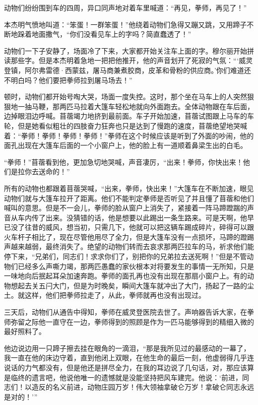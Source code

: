 动物们纷纷围到车的四周，异口同声地对着车里喊道：“再见，拳师，再见了！”

本杰明气愤地叫道：“笨蛋！一群笨蛋！”他绕着动物们急得又蹦又跳，又用蹄子不断地跺着地面撒气，“你们没看见车上的字吗？简直蠢透了！”

动物们一下子安静了，场面冷了下来，大家都开始关注车上面的字。穆尔丽开始拼读那些字。但是本杰明着急地一把把他推开，他的声音划开了死寂的气氛：“‘威灵登镇，阿尔弗雷德·西蒙兹，屠马商兼煮胶商，皮革和骨粉的供应商。’你们难道还不明白吗？他们要把拳师拉到屠马场去！”

顿时，动物们都开始号啕大哭，场面一度失控。这时，那个坐在马车上的人突然狠狠地一抽马鞭，那两匹马拉着大篷车轻松地就向外面跑去。全体动物跟在车后面，边掉眼泪边呼喊。苜蓿竭力地挤到最前面。车子开始加速，苜蓿试图跟上马车的车轮，但是她看似粗壮的四肢奋力狂奔也只是达到了慢跑的速度，苜蓿绝望地哭喊着：“拳师！拳师！拳师！拳师！”拳师在这个时候应该是听到了外面的吵闹，他的面孔出现在大篷车后面的一个小窗户上，他的脸上有一道顺着鼻梁生出的白毛。

“拳师！”苜蓿看到他，更加急切地哭喊，声音凄厉，“出来！拳师，你快出来！他们是拉你去送命的！”

所有的动物也都跟着苜蓿哭喊，“出来，拳师，快出来！”大篷车在不断加速，眼见动物们就与大篷车拉开了距离。他们不能判定拳师是否听见了并且懂了苜蓿和他们喊叫的意思。但是不一会儿，拳师的脸从窗户上消失了，紧接着一阵马蹄蹬踹的声音从车内传了出来。没猜错的话，他是想要以此踢出一条生路来。可是天啊，他早已没了往昔的威风，想当初，只需几下，他就可以把这辆车踢成碎片，碎得可以跟火车杆子相比了，现在尽管他用尽了全力，但是大篷车没有一点损坏，马蹄的蹬踢声越来越弱，最终消失了。绝望的动物们转而去哀求那两匹拉车的马，祈求他们能停下来，“兄弟们，同志们！求求你们了，别把你的兄弟拉去送死啊！”但是不管动物们已经多么声嘶力竭，那两匹愚蠢的家伙根本对将要发生的事情一无所知，只是一味地向后抿起耳朵加速奔跑。拳师的面孔再也没有出现在那扇小窗户上。有的动物想起去关五闩大门，但是为时晚矣，瞬间大篷车就冲出了大门，扬起了一路的尘土。就这样，他们把拳师拉走了，从此，拳师就再也没有出现过。

三天后，动物们从通告中得知，拳师在威灵登医院去世了。声响器告诉大家，在拳师弥留之际他一直守在一边，拳师得到的照顾是作为一匹马能够得到的精细入微的最好照料了。

他边说边用一只蹄子擦去挂在眼角的一滴泪，“那是我所见过的最感动的一幕了，我一直在他的床边守着，直到他闭上双眼，在他生命的最后一刻，他虚弱得几乎连说话的力气都没有，但是他还是拼尽全力，在我的耳边说了几句话，对，那应该算是临终的遗言吧，他说他唯一的遗憾就是没能坚持把风车建完。他说：‘前进，同志们！以造反的名义前进，动物庄园万岁！伟大领袖拿破仑万岁！拿破仑同志永远是对的！’”

